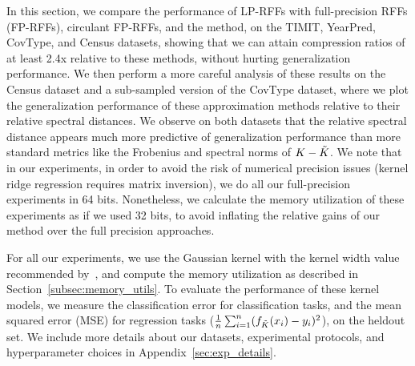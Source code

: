 In this section, we compare the performance of LP-RFFs with full-precision RFFs (FP-RFFs), circulant FP-RFFs, and the \Nystrom method, on the TIMIT, YearPred, CovType, and Census datasets, showing that we can attain compression ratios of at least 2.4x relative to these methods, without hurting generalization performance. We then perform a more careful analysis of these results on the Census dataset and a sub-sampled version of the CovType dataset, where we plot the generalization performance of these approximation methods relative to their relative spectral distances. We observe on both datasets that the relative spectral distance appears much more predictive of generalization performance than more standard metrics like the Frobenius and spectral norms of $K-\tilde{K}$.  We note that in our experiments, in order to avoid the risk of numerical precision issues (kernel ridge regression requires matrix inversion), we do all our full-precision experiments in 64 bits.  Nonetheless, we calculate the memory utilization of these experiments as if we used 32 bits, to avoid inflating the relative gains of our method over the full precision approaches.

For all our experiments, we use the Gaussian kernel with the kernel width value recommended by~\citet{may2017}, and compute the memory utilization as described in Section~\ref{subsec:memory_utils}. To evaluate the performance of these kernel models, we measure the classification error for classification tasks, and the mean squared error (MSE) for regression tasks ($\frac{1}{n}\sum_{i=1}^n (f_{\tilde{K}}(x_i) - y_i)^2$), on the heldout set. We include more details about our datasets, experimental protocols, and hyperparameter choices in Appendix~\ref{sec:exp_details}.

